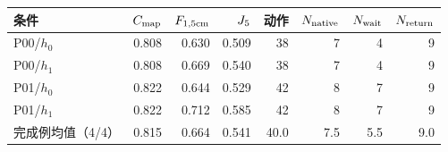 \begin{tabular}{lrrrrrrr}
\toprule
条件 & $C_{\mathrm{map}}$ & $F_{1,5\mathrm{cm}}$ & $J_{5}$ & 动作 & $N_{\rm native}$ & $N_{\rm wait}$ & $N_{\rm return}$\\\midrule
P00/$h_0$ & 0.808 & 0.630 & 0.509 & 38 & 7 & 4 & 9 \\
P00/$h_1$ & 0.808 & 0.669 & 0.540 & 38 & 7 & 4 & 9 \\
P01/$h_0$ & 0.822 & 0.644 & 0.529 & 42 & 8 & 7 & 9 \\
P01/$h_1$ & 0.822 & 0.712 & 0.585 & 42 & 8 & 7 & 9 \\
\midrule
完成例均值（4/4） & 0.815 & 0.664 & 0.541 & 40.0 & 7.5 & 5.5 & 9.0 \\
\bottomrule
\end{tabular}
